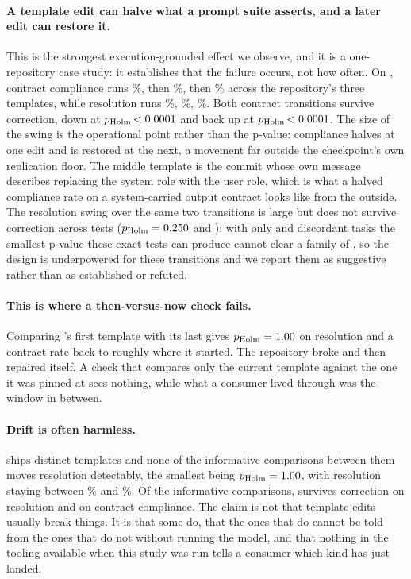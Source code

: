 \paragraph{A template edit can halve what a prompt suite asserts, and a later edit can restore it.}
This is the strongest execution-grounded effect we observe, and it is a one-repository case study:
it establishes that the failure occurs, not how often. On \ShortPhi{}, contract compliance runs
\ConPhiA\%, then \ConPhiB\%, then \ConPhiC\% across the
repository's three templates, while resolution runs \ResPhiA\%, \ResPhiB\%, \ResPhiC\%. Both
contract transitions survive correction, down at $p_{\text{Holm}}\,{<0.0001}$ and back up
at $p_{\text{Holm}}\,{<0.0001}$. The size of the swing is the operational point rather than the
p-value: compliance halves at one edit and is restored at the next, a movement far outside the
checkpoint's own replication floor. The middle template is the commit whose own message describes
replacing the system role with the user role, which is what a halved compliance rate on a
system-carried output contract looks like from the outside. The resolution swing over the same two
transitions is large but does not survive correction across \NFamily{} tests
($p_{\text{Holm}}=0.250$ and \PhiPHolmResUp); with only \PhiDiscDown{} and \PhiDiscUp{}
discordant tasks the smallest p-value these exact tests can produce cannot clear a family of
\NFamily{}, so the design is underpowered for these transitions and we report them as suggestive
rather than as established or refuted.

\paragraph{This is where a then-versus-now check fails.} Comparing \ShortPhi's first template with
its last gives $p_{\text{Holm}}=1.00$ on resolution and a contract rate back to roughly
where it started. The repository broke and then repaired itself. A check that compares only the
current template against the one it was pinned at sees nothing, while what a consumer lived through
was the window in between.

\paragraph{Drift is often harmless.} \ShortDS{} ships \NVersDSCoder{} distinct
templates and none of the \NDSPairs{} informative comparisons between them moves resolution detectably, the
smallest being $p_{\text{Holm}}=1.00$, with resolution staying between \ResDSCoderA\% and
\ResDSCoderF\%. Of the \NFamily{} informative comparisons, \NSigRes{} survives correction on
resolution and \NSigContract{} on contract compliance. The claim is not that template edits usually
break things. It is that some do, that the ones that do cannot be told from the ones that do not
without running the model, and that nothing in the tooling available when this study was run tells
a consumer which kind has just landed.

